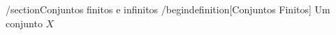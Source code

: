 /section{Conjuntos finitos e infinitos}
   /begin{definition}[Conjuntos Finitos]
      Um conjunto $X$ 
